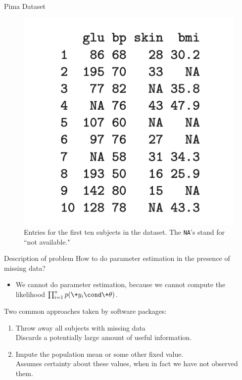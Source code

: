 \documentclass[10pt]{beamer}
\begin{document}
\begin{frame}{Pima Dataset}

\begin{figure}
\includegraphics[width=.6\textwidth]{images/pima_first_ten_entries}
\caption{  \footnotesize Entries for the first ten subjects in the dataset.  \scriptsize The \texttt{NA}'s stand for ``not available." }
\end{figure}
\end{frame}

\begin{frame}{Description of problem}
How to do parameter estimation in the presence of missing data? \\
\begin{itemize}
\item[]  \footnotesize  We cannot do parameter estimation,  because we cannot compute the likelihood $\prod_{i=1}^n p(\+y_i \cond \+\theta)$.  \normalsize
\end{itemize}
\vfill \vfill 
Two common approaches taken by software packages:
\begin{enumerate}
\item Throw away all subjects with missing data
\pause  \\
\quad \redx \footnotesize Discards a potentially large amount of useful information.  \normalsize
\pause \\
\item  Impute the population mean or some other fixed value. 
\pause \\
\quad \redx \footnotesize  Assumes certainty about these values,  when in fact we have not observed them.  \normalsize
\end{enumerate}
\end{frame}
\end{document}
